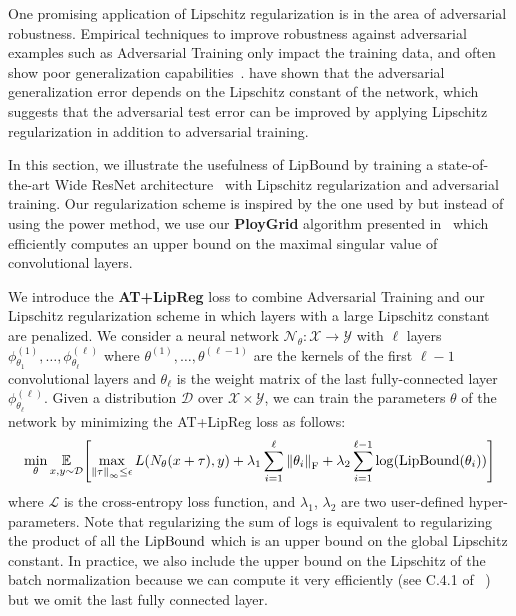 One promising application of Lipschitz regularization is in the area of adversarial robustness.
Empirical techniques to improve robustness against adversarial examples such as Adversarial Training only impact the training data,  and often show poor generalization capabilities~\cite{schmidt2018adversarially}.
\citet{farnia2018generalizable} have shown that the adversarial generalization error depends on the Lipschitz constant of the network, which suggests that the adversarial test error can be improved by applying Lipschitz regularization in addition to adversarial training.

In this section, we illustrate the usefulness of LipBound by training a state-of-the-art Wide ResNet architecture~\citep{zagoruyko2016wide} with Lipschitz regularization and adversarial training.
Our regularization scheme is inspired by the one used by \citet{yoshida2017spectral} but instead of using the power method, we use our \textbf{PloyGrid} algorithm presented in~ which efficiently computes an upper bound on the maximal singular value of convolutional layers.

We introduce the \textbf{AT+LipReg} loss to combine Adversarial Training and our Lipschitz regularization scheme in which layers with a large Lipschitz constant are penalized.
We consider a neural network $\mathcal N_\theta : \mathcal X \rightarrow \mathcal Y$ with $\ell$ layers $\phi^{(1)}_{\theta_1}, \dots, \phi^{(\ell)}_{\theta_\ell}$ where $\theta^{(1)}, \dots, \theta^{(\ell -1)}$ are the kernels of the first $\ell - 1$ convolutional layers and $\theta_\ell$ is the weight matrix of the last fully-connected  layer $\phi^{(\ell)}_{\theta_\ell}$.
Given a distribution $\mathcal D$ over $\mathcal X \times \mathcal Y$, we can train the parameters $\theta$ of the network by minimizing the AT+LipReg loss as follows:
\begin{equation}
  \min_{\theta} \Ebb_{x,y \sim \mathcal D} \left[ \max_{\norm{\tau}_\infty \leq \epsilon} L(N_\theta(x + \tau), y) + \lambda_1 \sum_{i=1}^\ell \norm{\theta_i}_\fro + \lambda_2 \sum_{i=1}^{\ell-1} \log\left( \lipbound\left(\theta_i\right)\right) \right]
  \label{equation:obj_function}
\end{equation}
where $\mathcal L$ is the cross-entropy loss function, and $\lambda_1$, $\lambda_2$ are two user-defined hyper-parameters.
Note that regularizing the sum of logs is equivalent to regularizing the product of all the $\mathrm{LipBound}$ which is an upper bound on the global Lipschitz constant.
In practice, we also include the upper bound on the Lipschitz of the batch normalization because we can compute it very efficiently (see C.4.1 of ~\citealt{tsuzuku2018lipschitz}) but we omit the last fully connected layer.

